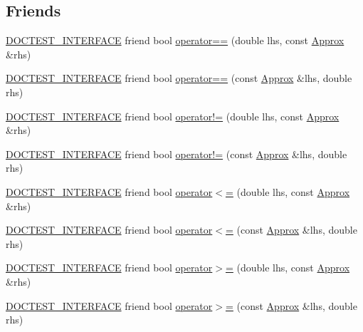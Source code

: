 \subsection*{Friends}
\begin{DoxyCompactItemize}
\item 
\hyperlink{doctest_8h_a9c16ffc635ec47f07797d21ede26b1a5}{D\+O\+C\+T\+E\+S\+T\+\_\+\+I\+N\+T\+E\+R\+F\+A\+CE} friend bool \hyperlink{classdoctest_1_1_approx_a2b6b56551f113fd12f4a52b4d3e5fd7e}{operator==} (double lhs, const \hyperlink{classdoctest_1_1_approx}{Approx} \&rhs)
\item 
\hyperlink{doctest_8h_a9c16ffc635ec47f07797d21ede26b1a5}{D\+O\+C\+T\+E\+S\+T\+\_\+\+I\+N\+T\+E\+R\+F\+A\+CE} friend bool \hyperlink{classdoctest_1_1_approx_a1b99d0c4c3924a253474e68ae30e1175}{operator==} (const \hyperlink{classdoctest_1_1_approx}{Approx} \&lhs, double rhs)
\item 
\hyperlink{doctest_8h_a9c16ffc635ec47f07797d21ede26b1a5}{D\+O\+C\+T\+E\+S\+T\+\_\+\+I\+N\+T\+E\+R\+F\+A\+CE} friend bool \hyperlink{classdoctest_1_1_approx_a44d4bbc575291095c884848887538233}{operator!=} (double lhs, const \hyperlink{classdoctest_1_1_approx}{Approx} \&rhs)
\item 
\hyperlink{doctest_8h_a9c16ffc635ec47f07797d21ede26b1a5}{D\+O\+C\+T\+E\+S\+T\+\_\+\+I\+N\+T\+E\+R\+F\+A\+CE} friend bool \hyperlink{classdoctest_1_1_approx_ae86972ba14656f422afdcc60cd2cdb08}{operator!=} (const \hyperlink{classdoctest_1_1_approx}{Approx} \&lhs, double rhs)
\item 
\hyperlink{doctest_8h_a9c16ffc635ec47f07797d21ede26b1a5}{D\+O\+C\+T\+E\+S\+T\+\_\+\+I\+N\+T\+E\+R\+F\+A\+CE} friend bool \hyperlink{classdoctest_1_1_approx_af2fef67cf4508a446eeaf38dafae661f}{operator$<$=} (double lhs, const \hyperlink{classdoctest_1_1_approx}{Approx} \&rhs)
\item 
\hyperlink{doctest_8h_a9c16ffc635ec47f07797d21ede26b1a5}{D\+O\+C\+T\+E\+S\+T\+\_\+\+I\+N\+T\+E\+R\+F\+A\+CE} friend bool \hyperlink{classdoctest_1_1_approx_a7f32e572caa5ee152b8ade301fcfd838}{operator$<$=} (const \hyperlink{classdoctest_1_1_approx}{Approx} \&lhs, double rhs)
\item 
\hyperlink{doctest_8h_a9c16ffc635ec47f07797d21ede26b1a5}{D\+O\+C\+T\+E\+S\+T\+\_\+\+I\+N\+T\+E\+R\+F\+A\+CE} friend bool \hyperlink{classdoctest_1_1_approx_acf882dbff26c57cd8404da3edd46f45e}{operator$>$=} (double lhs, const \hyperlink{classdoctest_1_1_approx}{Approx} \&rhs)
\item 
\hyperlink{doctest_8h_a9c16ffc635ec47f07797d21ede26b1a5}{D\+O\+C\+T\+E\+S\+T\+\_\+\+I\+N\+T\+E\+R\+F\+A\+CE} friend bool \hyperlink{classdoctest_1_1_approx_a52e1bcec19171f0ec55cc3a280188a03}{operator$>$=} (const \hyperlink{classdoctest_1_1_approx}{Approx} \&lhs, double rhs)

\end{DoxyCompactItemize}
